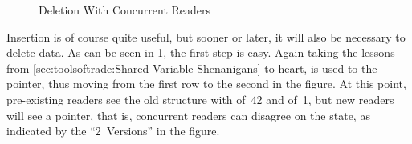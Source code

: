 \begin{figure}
\centering
{}
\caption{Deletion With Concurrent Readers}
\label{fig:defer:Deletion With Concurrent Readers}
\end{figure}

Insertion is of course quite useful, but sooner or later, it will also
be necessary to delete data.
As can be seen in
\cref{fig:defer:Deletion With Concurrent Readers},
the first step is easy.
Again taking the lessons from
\cref{sec:toolsoftrade:Shared-Variable Shenanigans}
to heart,  is used to  the pointer,
thus moving from the first row to the second in the figure.
At this point, pre-existing readers see the old structure with
 of~42 and  of~1, but new readers will see
a  pointer, that is, concurrent readers can disagree on
the state, as indicated by the ``2~Versions'' in the figure.

